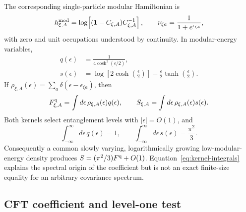 \documentclass[aps,prx,onecolumn,nofootinbib,superscriptaddress,longbibliography]{revtex4-2}
\newcommand{\Id}{\mathbf{1}}
\begin{document}
The corresponding single-particle modular Hamiltonian is
\begin{equation}
 h_{\xi,A}^{\rm mod}
 =\log\!\left[(\Id-C_{\xi,A})C_{\xi,A}^{-1}\right],
 \qquad
 \nu_{\xi a}=\frac{1}{1+e^{\epsilon_{\xi a}}},
 \label{eq:modular-correlation-map}
\end{equation}
with zero and unit occupations understood by continuity.  In modular-energy variables,
\begin{align}
 q(\epsilon)&=\frac{1}{4\cosh^2(\epsilon/2)},\\
 s(\epsilon)&=
 \log\!\left[2\cosh\!\left(\frac{\epsilon}{2}\right)\right]
 -\frac{\epsilon}{2}\tanh\!\left(\frac{\epsilon}{2}\right).
 \label{eq:modular-spectral-kernels}
\end{align}
If $\rho_{\xi,A}(\epsilon)=\sum_a\delta(\epsilon-\epsilon_{\xi a})$, then
\begin{equation}
 F_{\xi,A}^{\rm q}=\int d\epsilon\,\rho_{\xi,A}(\epsilon)q(\epsilon),
 \qquad
 S_{\xi,A}=\int d\epsilon\,\rho_{\xi,A}(\epsilon)s(\epsilon).
 \label{eq:modular-density-integrals}
\end{equation}
Both kernels select entanglement levels with $|\epsilon|=O(1)$, and
\begin{equation}
 \int_{-\infty}^{\infty}d\epsilon\,q(\epsilon)=1,
 \qquad
 \int_{-\infty}^{\infty}d\epsilon\,s(\epsilon)=\frac{\pi^2}{3}.
 \label{eq:kernel-integrals}
\end{equation}
Consequently a common slowly varying, logarithmically growing low-modular-energy density
produces $S=(\pi^2/3)F^{\rm q}+O(1)$.  Equation~\eqref{eq:kernel-integrals} explains the
spectral origin of the coefficient but is not an exact finite-size equality for an
arbitrary covariance spectrum.

\subsection{CFT coefficient and level-one test}
\end{document}
